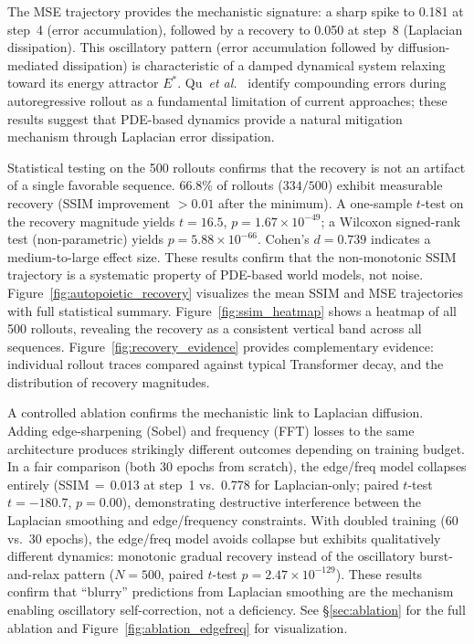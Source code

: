 \documentclass{article}
\newcommand{\etal}{\textit{et al.}}
\begin{document}
The MSE trajectory provides the mechanistic signature: a sharp spike to 0.181 at step~4 (error accumulation), followed by a recovery to 0.050 at step~8 (Laplacian dissipation). This oscillatory pattern (error accumulation followed by diffusion-mediated dissipation) is characteristic of a damped dynamical system relaxing toward its energy attractor $E^*$. Qu~\etal{}~\cite{qu2026representation} identify compounding errors during autoregressive rollout as a fundamental limitation of current approaches; these results suggest that PDE-based dynamics provide a natural mitigation mechanism through Laplacian error dissipation.

Statistical testing on the 500 rollouts confirms that the recovery is not an artifact of a single favorable sequence. 66.8\% of rollouts ($334/500$) exhibit measurable recovery (SSIM improvement $> 0.01$ after the minimum). A one-sample $t$-test on the recovery magnitude yields $t\!=\!16.5$, $p\!=\!1.67 \times 10^{-49}$; a Wilcoxon signed-rank test (non-parametric) yields $p\!=\!5.88 \times 10^{-66}$. Cohen's $d\!=\!0.739$ indicates a medium-to-large effect size. These results confirm that the non-monotonic SSIM trajectory is a systematic property of PDE-based world models, not noise. Figure~\ref{fig:autopoietic_recovery} visualizes the mean SSIM and MSE trajectories with full statistical summary. Figure~\ref{fig:ssim_heatmap} shows a heatmap of all 500 rollouts, revealing the recovery as a consistent vertical band across all sequences. Figure~\ref{fig:recovery_evidence} provides complementary evidence: individual rollout traces compared against typical Transformer decay, and the distribution of recovery magnitudes.

A controlled ablation confirms the mechanistic link to Laplacian diffusion. Adding edge-sharpening (Sobel) and frequency (FFT) losses to the same architecture produces strikingly different outcomes depending on training budget. In a fair comparison (both 30 epochs from scratch), the edge/freq model collapses entirely (SSIM\,$=$\,0.013 at step~1 vs.\ 0.778 for Laplacian-only; paired $t$-test $t = -180.7$, $p = 0.00$), demonstrating destructive interference between the Laplacian smoothing and edge/frequency constraints. With doubled training (60 vs.\ 30 epochs), the edge/freq model avoids collapse but exhibits qualitatively different dynamics: monotonic gradual recovery instead of the oscillatory burst-and-relax pattern ($N\!=\!500$, paired $t$-test $p\!=\!2.47 \times 10^{-129}$). These results confirm that ``blurry'' predictions from Laplacian smoothing are the mechanism enabling oscillatory self-correction, not a deficiency. See \S\ref{sec:ablation} for the full ablation and Figure~\ref{fig:ablation_edgefreq} for visualization.
\end{document}
